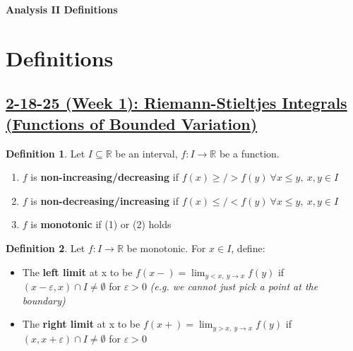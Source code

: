 \documentclass[12pt,a4paper]{article}
\theoremstyle{definition}
\newtheorem{defin}{Definition}[subsection]
\newenvironment{definition}{
  \begin{defin}
}{
  \end{defin}
  \vspace{0.125em}
}
\begin{document}
\begin{center}
  {\Large \bf Analysis II Definitions}\\[6pt]
\end{center}

\section*{Definitions}
\setcounter{defin}{0}
\setcounter{ex}{0}
\subsection*{\underline{\textbf{2-18-25 (Week 1): Riemann-Stieltjes Integrals (Functions of Bounded Variation)}}}
\begin{definition}
  Let $I \subseteq \mathbb{R}$ be an interval, $f: I \rightarrow \mathbb{R}$ be a function.
  \begin{enumerate} [(1)]
    \item $f$ is \textbf{non-increasing/decreasing} if $f(x) \geq/> f(y) \ \forall x \leq y, \ x, y \in I$
    \item $f$ is \textbf{non-decreasing/increasing} if $f(x) \leq/< f(y) \ \forall x \leq y, \ x, y \in I$
    \item $f$ is \textbf{monotonic} if (1) or (2) holds
  \end{enumerate}
\end{definition}

\begin{definition}
  Let $f: I \rightarrow \mathbb{R}$ be monotonic.
  For $x \in I$, define:
  \begin{itemize}
    \item The \textbf{left limit} at x to be \underline{$f(x-) = \lim_{y < x, \ y \rightarrow x} f(y)$} if $(x - \varepsilon, x) \cap I \neq \emptyset$ for $\varepsilon > 0$ \textit{(e.g. we cannot just pick a point at the boundary)}
    \item The \textbf{right limit} at x to be \underline{$f(x+) = \lim_{y > x, \ y \rightarrow x} f(y)$} if $(x, x + \varepsilon) \cap I \neq \emptyset$ for $\varepsilon > 0$
  \end{itemize}
\end{definition}
\end{document}
